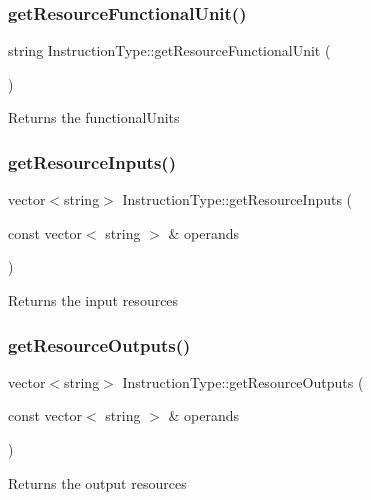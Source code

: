 \subsubsection{\texorpdfstring{get\+Resource\+Functional\+Unit()}{getResourceFunctionalUnit()}}
{\footnotesize\ttfamily string Instruction\+Type\+::get\+Resource\+Functional\+Unit (\begin{DoxyParamCaption}{ }\end{DoxyParamCaption})}

Returns the functional\+Units \mbox{\label{classInstructionType_acce0f34d0675a5e29518ecba9bcb13c1}} 
\subsubsection{\texorpdfstring{get\+Resource\+Inputs()}{getResourceInputs()}}
{\footnotesize\ttfamily vector$<$string$>$ Instruction\+Type\+::get\+Resource\+Inputs (\begin{DoxyParamCaption}\item[{const vector$<$ string $>$ \&}]{operands }\end{DoxyParamCaption})}

Returns the input resources \mbox{\label{classInstructionType_a96e341d8911549b19e8d975297e3e131}} 
\subsubsection{\texorpdfstring{get\+Resource\+Outputs()}{getResourceOutputs()}}
{\footnotesize\ttfamily vector$<$string$>$ Instruction\+Type\+::get\+Resource\+Outputs (\begin{DoxyParamCaption}\item[{const vector$<$ string $>$ \&}]{operands }\end{DoxyParamCaption})}

Returns the output resources \mbox{\label{classInstructionType_a40c94ccf0b13f186524e06972f08bca3}} 

